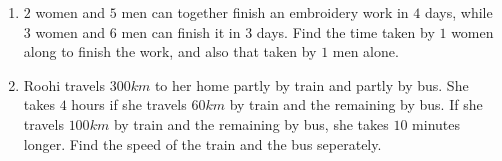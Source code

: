 \begin{enumerate}
\begin{enumerate}[label=(\roman*)]
\item $2$ women and $5$ men can together finish an embroidery work in $4$ days, while $3$ women and $6$ men can finish it in $3$ days. Find the time taken by $1$ women along to finish the work, and also that taken by $1$ men alone.
\item Roohi travels $300 km$ to her home partly by train and partly by bus. She takes $4$ hours if she travels $60km$ by train and the remaining by bus. If she travels $100km$ by train and the remaining by bus, she takes $10$ minutes longer. Find the speed of the train and the bus seperately.
\end{enumerate}
\end{enumerate}

